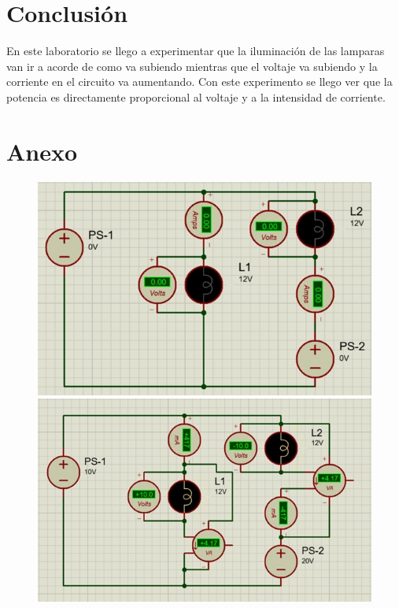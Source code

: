 \section{Conclusión}
En este laboratorio se llego a experimentar  que la iluminación de las lamparas van ir a acorde de como va subiendo mientras que el voltaje va subiendo y la corriente en el circuito va aumentando. Con este experimento se llego ver que la potencia es directamente proporcional al voltaje y a la intensidad de corriente.
\section{Anexo}
\begin{figure}[h]
	\begin{minipage}{0.35\textwidth}
		\centering
		\includegraphics[width=0.8\linewidth]{imagenes/3}
		
	\end{minipage}%
	\begin{minipage}{0.35\textwidth}
		\centering
		\includegraphics[width=0.8\linewidth]{imagenes/4}
		
	\end{minipage}
\end{figure}

